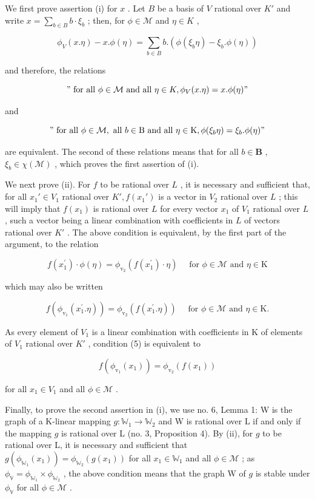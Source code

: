 We first prove assertion (i) for \(x\) . Let \(B\) be a basis of \(V\) rational over \(K'\) and write \(x = \sum_{b \in B} b \cdot \xi_b\) ; then, for \(\phi \in \mathcal{M}\) and \(\eta \in K\) ,

\[
\phi_ {V} (x. \eta) - x. \phi (\eta) = \sum_ {b \in B} b. (\phi (\xi_ {b} \eta) - \xi_ {b}. \phi (\eta))
\]

and therefore, the relations

\[
" \text { for   all } \phi \in \mathcal {M} \text { and   all } \eta \in K, \phi_ {V} (x. \eta) = x. \phi (\eta)"
\]

and

\[
" \text { for   all } \phi \in \mathcal {M}, \text { all } b \in \mathrm{B} \text { and   all } \eta \in \mathrm{K}, \phi (\xi_ {b} \eta) = \xi_ {b}. \phi (\eta)"
\]

are equivalent. The second of these relations means that for all \(b \in \mathbf{B}\) , \(\xi_b \in \chi(\mathcal{M})\) , which proves the first assertion of (i).

We next prove (ii). For \(f\) to be rational over \(L\) , it is necessary and sufficient that, for all \(x_1' \in V_1\) rational over \(K', f(x_1')\) is a vector in \(V_2\) rational over \(L\) ; this will imply that \(f(x_1)\) is rational over \(L\) for every vector \(x_1\) of \(V_1\) rational over \(L\) , such a vector being a linear combination with coefficients in \(L\) of vectors rational over \(K'\) . The above condition is equivalent, by the first part of the argument, to the relation

\[
f (x _ {1} ^ {\prime}) \cdot \phi (\eta) = \phi_ {\mathrm{v} _ {2}} (f (x _ {1} ^ {\prime}) \cdot \eta) \quad \text { for } \phi \in \mathcal {M} \text { and } \eta \in \mathrm{K}\tag{4}
\]

which may also be written

\[
f (\phi_ {\mathrm{v} _ {1}} (x _ {1} ^ {\prime}. \eta)) = \phi_ {\mathrm{v} _ {2}} (f (x _ {1} ^ {\prime}. \eta)) \quad \text { for } \phi \in \mathcal {M} \text { and } \eta \in \mathrm{K}.\tag{5}
\]

As every element of \(V_{1}\) is a linear combination with coefficients in K of elements of \(V_{1}\) rational over \(K'\) , condition (5) is equivalent to

\[
f (\phi_ {\mathrm{v} _ {1}} (x _ {1})) = \phi_ {\mathrm{v} _ {2}} (f (x _ {1}))
\]

for all \(x_{1} \in V_{1}\) and all \(\phi \in \mathcal{M}\) .

Finally, to prove the second assertion in (i), we use no. 6, Lemma 1: W is the graph of a K-linear mapping \(g \colon \mathbb{W}_1 \to \mathbb{W}_2\) and W is rational over L if and only if the mapping \(g\) is rational over L (no. 3, Proposition 4). By (ii), for \(g\) to be rational over L, it is necessary and sufficient that \(g(\phi_{\mathbb{W}_1}(x_1)) = \phi_{\mathbb{W}_2}(g(x_1))\) for all \(x_1 \in \mathbb{W}_1\) and all \(\phi \in \mathcal{M}\) ; as \(\phi_{\mathbb{V}} = \phi_{\mathbb{W}_1} \times \phi_{\mathbb{W}_2}\) , the above condition means that the graph W of \(g\) is stable under \(\phi_{\mathbb{V}}\) for all \(\phi \in \mathcal{M}\) .

